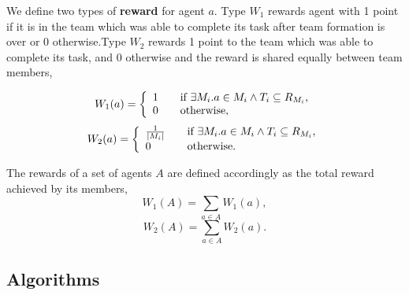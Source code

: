 \documentclass{llncs}
\newcommand{\comment}[1]{{\color{red}{[\sf #1]}}}
\begin{document}
\begin{definition}
We define two types of \textbf{reward} for agent $a$. Type $W_1$ rewards agent with 1 point if it is in the team which was able to complete its task after team formation is over or 0 otherwise.Type $W_2$ rewards 1 point to the team which was able to complete its task, and 0 otherwise and the reward is shared equally between team members,

\begin{equation}
W_1(a) = \left\{
  \begin{array}{l l}
    1 & \quad \text{if $\exists M_i . a \in M_i \wedge T_i \subseteq R_{M_i}$,}\\
    0 & \quad \text{otherwise,}\\
  \end{array} \right.
\label{eq:w1agent}
\end{equation}
\begin{equation}
W_2(a) = \left\{
  \begin{array}{l l}
    \frac{1}{|M_i|} & \quad \text{if $\exists M_i . a \in M_i \wedge T_i \subseteq R_{M_i}$,}\\
    0 & \quad \text{otherwise.}\\
  \end{array} \right.
\label{eq:w2agent}
\end{equation}

The rewards of a set of agents $A$ are defined accordingly as the total reward achieved by its members,
\begin{equation}
 W_1(A) = \sum_{a \in A} W_1(a),
\label{eq:w1organisation}
\end{equation}
\begin{equation}
 W_2(A) = \sum_{a \in A} W_2(a).
\label{eq:w2organisation}
\end{equation}

\end{definition}

\subsection{Algorithms}

\comment{Algorithm descriptions}
\end{document}
